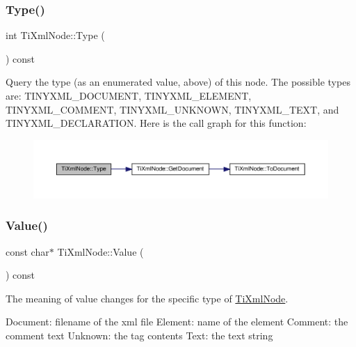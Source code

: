 \subsubsection{\texorpdfstring{Type()}{Type()}}
{\footnotesize\ttfamily int Ti\+Xml\+Node\+::\+Type (\begin{DoxyParamCaption}{ }\end{DoxyParamCaption}) const\hspace{0.3cm}{\ttfamily [inline]}}

Query the type (as an enumerated value, above) of this node. The possible types are\+: T\+I\+N\+Y\+X\+M\+L\+\_\+\+D\+O\+C\+U\+M\+E\+NT, T\+I\+N\+Y\+X\+M\+L\+\_\+\+E\+L\+E\+M\+E\+NT, T\+I\+N\+Y\+X\+M\+L\+\_\+\+C\+O\+M\+M\+E\+NT, T\+I\+N\+Y\+X\+M\+L\+\_\+\+U\+N\+K\+N\+O\+WN, T\+I\+N\+Y\+X\+M\+L\+\_\+\+T\+E\+XT, and T\+I\+N\+Y\+X\+M\+L\+\_\+\+D\+E\+C\+L\+A\+R\+A\+T\+I\+ON. Here is the call graph for this function\+:
\nopagebreak
\begin{figure}[H]
\begin{center}
\leavevmode
\includegraphics[width=350pt]{classTiXmlNode_a0f4dd916b2afc2ab2f1a84f3e2b8fd5d_cgraph}
\end{center}
\end{figure}
\mbox{\label{classTiXmlNode_ad44dfe927d49a74dd78b72b7514417ad}} 
\subsubsection{\texorpdfstring{Value()}{Value()}}
{\footnotesize\ttfamily const char$\ast$ Ti\+Xml\+Node\+::\+Value (\begin{DoxyParamCaption}{ }\end{DoxyParamCaption}) const\hspace{0.3cm}{\ttfamily [inline]}}

The meaning of \textquotesingle{}value\textquotesingle{} changes for the specific type of \hyperlink{classTiXmlNode}{Ti\+Xml\+Node}. \begin{DoxyVerb}Document:   filename of the xml file
Element:    name of the element
Comment:    the comment text
Unknown:    the tag contents
Text:       the text string
\end{DoxyVerb}


